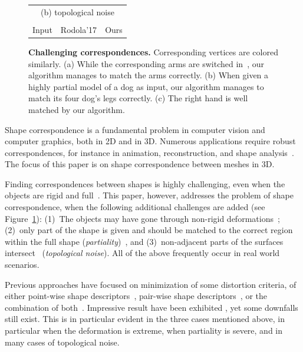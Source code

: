 \begin{figure}[b!]
\begin{tabular}{ccc}
		\multicolumn{3}{c}{(b) topological noise}\\\\
		Input & Rodola'17\cite{rodola2017partial} & Ours \\
	\end{tabular}
	\caption{{\textbf{Challenging correspondences.}}  
		Corresponding vertices are colored similarly.
		(a) While the corresponding arms are switched in~\cite{rodola2017partial}, our algorithm manages to match the arms correctly.
		(b) When given a highly partial model of a dog as input, our algorithm manages to match its four dog's legs correctly.
		(c) The right hand is well matched by our algorithm. 
	}
	\label{fig:teaser}
\end{figure}

Shape correspondence is a fundamental problem in computer vision and computer graphics, both in 2D and in 3D.
Numerous applications require robust correspondences, for instance in animation, reconstruction, and shape analysis~\cite{van2011survey}.
The focus of this paper is on shape correspondence between meshes in 3D.




Finding correspondences between shapes is highly challenging, even when the objects are rigid and full~\cite{Biasotti03,barequet1997partial,mellado2014super,Zeng_2017_CVPR}. 
This paper, however, addresses the problem of shape correspondence, when the following additional challenges are added (see Figure~\ref{fig:teaser}):
(1)~The objects may have gone through non-rigid deformations~\cite{dubrovina2010matching,lipman2009mobius,Maron:2016:PRV:2897824.2925913,solomon2016entropic,vestner2017product}; 
(2)~only part of the shape is given and should be  matched to the correct region within the full shape ({\em partiality})~\cite{biasotti2006sub,itskovich2011surface,rodola2017partial,sahilliouglu2012minimum},  and
(3)~non-adjacent parts of the surfaces intersect~\cite{chen2015robust,litany2017fully,vanKaick:2013:BMP:2771539.2771553,vestner2017efficient} ({\em topological noise}).
All of the above frequently occur in real world scenarios.

Previous approaches have focused on minimization of some distortion criteria, of either point-wise shape descriptors~\cite{litany2017fully,rodola2017partial}, pair-wise shape descriptors~\cite{sahilliouglu2012minimum}, or the combination of both~\cite{vestner2017efficient}.
Impressive result have been exhibited , yet some downfalls still exist.
This is in particular evident in the three cases mentioned above, in particular when the  deformation is extreme, when partiality is severe, and in many cases of topological noise.

